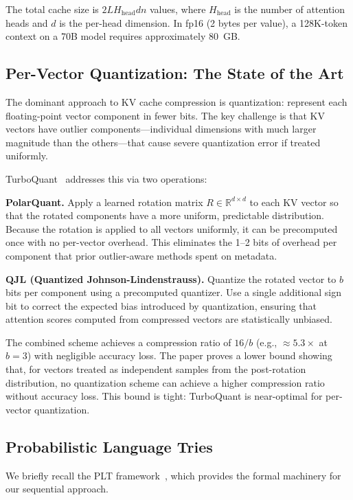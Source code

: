 \documentclass[11pt]{article}
\begin{document}
The total cache size is $2LH_{\mathrm{head}}dn$ values, where $H_{\mathrm{head}}$ is the number of attention
heads and $d$ is the per-head dimension.  In fp16 (2 bytes per value), a
128K-token context on a 70B model requires approximately 80~GB.

\subsection{Per-Vector Quantization: The State of the Art}

The dominant approach to KV cache compression is quantization: represent each
floating-point vector component in fewer bits.  The key challenge is that KV
vectors have outlier components---individual dimensions with much larger magnitude
than the others---that cause severe quantization error if treated uniformly.

TurboQuant~\cite{turbo2026} addresses this via two operations:

\textbf{PolarQuant.}  Apply a learned rotation matrix $R \in \mathbb{R}^{d \times d}$
to each KV vector so that the rotated components have a more uniform, predictable
distribution.  Because the rotation is applied to all vectors uniformly, it can
be precomputed once with no per-vector overhead.  This eliminates the 1--2 bits
of overhead per component that prior outlier-aware methods spent on metadata.

\textbf{QJL (Quantized Johnson-Lindenstrauss).}  Quantize the rotated vector to
$b$ bits per component using a precomputed quantizer.  Use a single additional
sign bit to correct the expected bias introduced by quantization, ensuring that
attention scores computed from compressed vectors are statistically unbiased.

The combined scheme achieves a compression ratio of $16/b$ (e.g., $\approx 5.3\times$
at $b = 3$) with negligible accuracy loss.  The paper proves a lower bound showing
that, for vectors treated as independent samples from the post-rotation distribution,
no quantization scheme can achieve a higher compression ratio without accuracy loss.
This bound is tight: TurboQuant is near-optimal for per-vector quantization.

\subsection{Probabilistic Language Tries}
\label{sec:plt_background}

We briefly recall the PLT framework~\cite{plt2026}, which provides the formal
machinery for our sequential approach.
\end{document}
